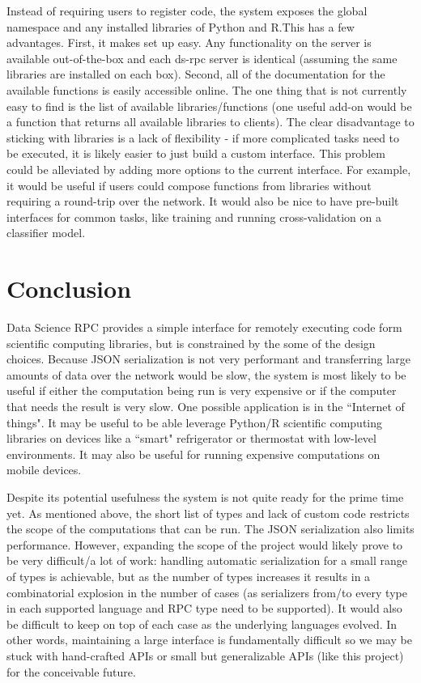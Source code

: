 \documentclass[11pt]{article}
\begin{document}
Instead of requiring users to register code, the system exposes the global namespace and any installed libraries of Python and R.This has a few advantages. First, it makes set up easy. Any functionality on the server is available out-of-the-box and each ds-rpc server is identical (assuming the same libraries are installed on each box). Second, all of the documentation for the available functions is easily accessible online. The one thing that is not currently easy to find is the list of available libraries/functions (one useful add-on would be a function that returns all available libraries to clients). The clear disadvantage to sticking with libraries is a lack of flexibility - if more complicated tasks need to be executed, it is likely easier to just build a custom interface. This problem could be alleviated by adding more options to the current interface. For example, it would be useful if users could compose functions from libraries without requiring a round-trip over the network. It would also be nice to have pre-built interfaces for common tasks, like training and running cross-validation on a classifier model.

\section{Conclusion}

Data Science RPC provides a simple interface for remotely executing code form scientific computing libraries, but is constrained by the some of the design choices. Because JSON serialization is not very performant and transferring large amounts of data over the network would be slow, the system is most likely to be useful if either the computation being run is very expensive or if the computer that needs the result is very slow. One possible application is in the ``Internet of things". It may be useful to be able leverage Python/R scientific computing libraries on devices like a ``smart" refrigerator or thermostat with low-level environments. It may also be useful for running expensive computations on mobile devices.

Despite its potential usefulness the system is not quite ready for the prime time yet. As mentioned above, the short list of types and lack of custom code restricts the scope of the computations that can be run. The JSON serialization also limits performance. However, expanding the scope of the project would likely prove to be very difficult/a lot of work: handling automatic serialization for a small range of types is achievable, but as the number of types increases it results in a combinatorial explosion in the number of cases (as serializers from/to every type in each supported language and RPC type need to be supported). It would also be difficult to keep on top of each case as the underlying languages evolved. In other words, maintaining a large interface is fundamentally difficult so we may be stuck with hand-crafted APIs or small but generalizable APIs (like this project) for the conceivable future. 




\end{document}
